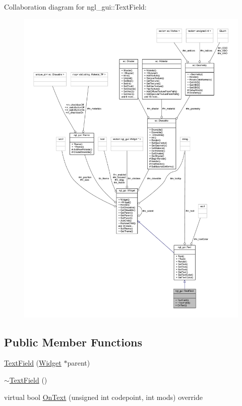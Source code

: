 Collaboration diagram for ngl\+\_\+gui\+:\+:Text\+Field\+:
\nopagebreak
\begin{figure}[H]
\begin{center}
\leavevmode
\includegraphics[width=350pt]{classngl__gui_1_1_text_field__coll__graph}
\end{center}
\end{figure}
\subsection*{Public Member Functions}
\begin{DoxyCompactItemize}
\item 
\mbox{\hyperlink{classngl__gui_1_1_text_field_a6e956614a12e8783a40a6e420fb5f6b1}{Text\+Field}} (\mbox{\hyperlink{classngl__gui_1_1_widget}{Widget}} $\ast$parent)
\item 
\mbox{\hyperlink{classngl__gui_1_1_text_field_a092f9705212c34b2c649d92da08c18c2}{$\sim$\+Text\+Field}} ()
\item 
virtual bool \mbox{\hyperlink{classngl__gui_1_1_text_field_a4da976e8cb8e376b3063322d72bdcbe6}{On\+Text}} (unsigned int codepoint, int mods) override
\end{DoxyCompactItemize}
